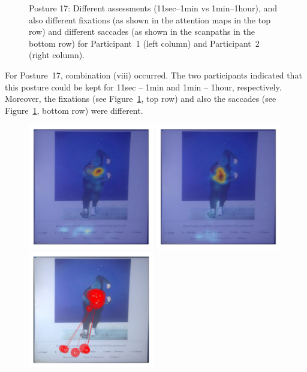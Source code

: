 \documentclass[11pt]{asaproc}
\begin{document}
\begin{figure}[t]
\begin{center}
\end{center}
\caption{\label{Posture17View}Posture 17: Different assessments (11sec--1min vs 1min--1hour), 
and also different fixations (as shown in the attention maps in the top row) and 
different saccades (as shown in the scanpaths in the bottom row)
for Participant~1 (left column) and Participant~2 (right column).
}
\end{figure}


For Posture~17, combination (viii) occurred.
The two participants indicated that this posture could be kept for
11sec -- 1min and 1min -- 1hour, respectively. Moreover, the
fixations (see Figure~\ref{Posture17View}, top row) and also 
the saccades (see Figure~\ref{Posture17View}, bottom row) were different.


\begin{figure}[t]
\begin{center} 
\includegraphics[width=0.49\textwidth]{figures/Kayd_heatmap_posture14.jpg} \hspace{1pt}
\includegraphics[width=0.49\textwidth]{figures/Subject13_heatmap_posture14.jpg}
\includegraphics[width=0.49\textwidth]{figures/Kayd_scanpath_posture14.jpg} \hspace{1pt}

\end{center}
\end{figure}
\end{document}
